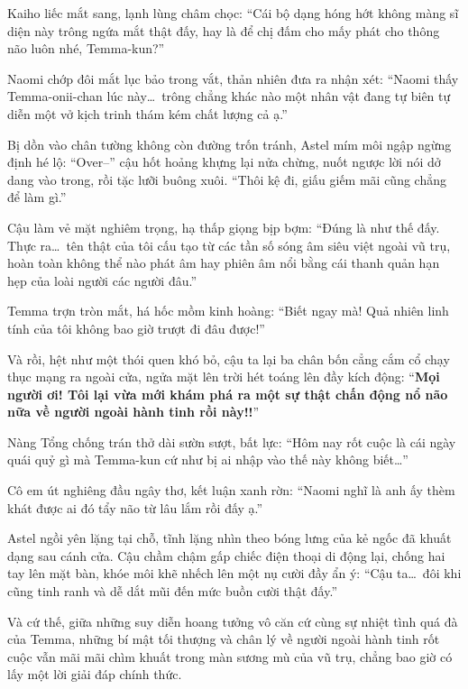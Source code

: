 \documentclass[../main.tex]{subfiles}
\begin{document}
Kaiho liếc mắt sang, lạnh lùng châm chọc: ``Cái bộ dạng hóng hớt không màng sĩ diện này trông ngứa mắt thật đấy, hay là để chị đấm cho mấy phát cho thông não luôn nhé, Temma-kun?''

Naomi chớp đôi mắt lục bảo trong vắt, thản nhiên đưa ra nhận xét: ``Naomi thấy Temma-onii-chan lúc này\dots\ trông chẳng khác nào một nhân vật đang tự biên tự diễn một vở kịch trinh thám kém chất lượng cả ạ.''

Bị dồn vào chân tường không còn đường trốn tránh, Astel mím môi ngập ngừng định hé lộ: ``Over--'' cậu hốt hoảng khựng lại nửa chừng, nuốt ngược lời nói dở dang vào trong, rồi tặc lưỡi buông xuôi. ``Thôi kệ đi, giấu giếm mãi cũng chẳng để làm gì.''

Cậu làm vẻ mặt nghiêm trọng, hạ thấp giọng bịp bợm: ``Đúng là như thế đấy. Thực ra\dots\ tên thật của tôi cấu tạo từ các tần số sóng âm siêu việt ngoài vũ trụ, hoàn toàn không thể nào phát âm hay phiên âm nổi bằng cái thanh quản hạn hẹp của loài người các người đâu.''

Temma trợn tròn mắt, há hốc mồm kinh hoàng: ``Biết ngay mà! Quả nhiên linh tính của tôi không bao giờ trượt đi đâu được!''

Và rồi, hệt như một thói quen khó bỏ, cậu ta lại ba chân bốn cẳng cắm cổ chạy thục mạng ra ngoài cửa, ngửa mặt lên trời hét toáng lên đầy kích động: ``\textbf{Mọi người ơi! Tôi lại vừa mới khám phá ra một sự thật chấn động nổ não nữa về người ngoài hành tinh rồi này!!}''


Nàng Tổng chống trán thở dài sườn sượt, bất lực: ``Hôm nay rốt cuộc là cái ngày quái quỷ gì mà Temma-kun cứ như bị ai nhập vào thế này không biết\dots''

Cô em út nghiêng đầu ngây thơ, kết luận xanh rờn: ``Naomi nghĩ là anh ấy thèm khát được ai đó tẩy não từ lâu lắm rồi đấy ạ.''

Astel ngồi yên lặng tại chỗ, tĩnh lặng nhìn theo bóng lưng của kẻ ngốc đã khuất dạng sau cánh cửa. Cậu chầm chậm gấp chiếc điện thoại di động lại, chống hai tay lên mặt bàn, khóe môi khẽ nhếch lên một nụ cười đầy ẩn ý: ``Cậu ta\dots\ đôi khi cũng tinh ranh và dễ dắt mũi đến mức buồn cười thật đấy.''

Và cứ thế, giữa những suy diễn hoang tưởng vô căn cứ cùng sự nhiệt tình quá đà của Temma, những bí mật tối thượng và chân lý về người ngoài hành tinh rốt cuộc vẫn mãi mãi chìm khuất trong màn sương mù của vũ trụ, chẳng bao giờ có lấy một lời giải đáp chính thức.
\end{document}
